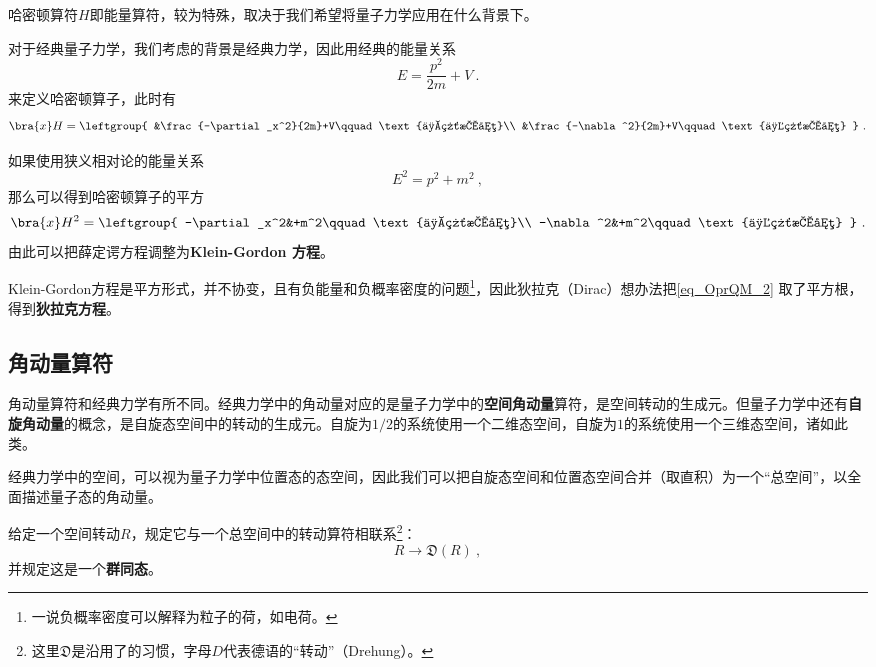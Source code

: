 哈密顿算符$H$即能量算符，较为特殊，取决于我们希望将量子力学应用在什么背景下。

对于经典量子力学，我们考虑的背景是经典力学，因此用经典的能量关系
\begin{equation}
E=\frac{p^2}{2m}+V~.
\end{equation}
来定义哈密顿算子，此时有
\begin{equation}
\bra{x}H = \leftgroup{
    &\frac{-\partial_x^2}{2m}+V\qquad\text{一维情况}\\
    &\frac{-\nabla^2}{2m}+V\qquad\text{三维情况}
}~.
\end{equation}

如果使用狭义相对论的能量关系
\begin{equation}
E^2 = p^2+m^2~,
\end{equation}
那么可以得到哈密顿算子的平方
\begin{equation}\label{eq_OprQM_2}
\bra{x}H^2 = \leftgroup{
    -\partial_x^2&+m^2\qquad\text{一维情况}\\
    -\nabla^2&+m^2\qquad\text{三维情况}
}~.
\end{equation}
由此可以把薛定谔方程调整为\textbf{Klein-Gordon 方程}。

Klein-Gordon方程是平方形式，并不协变，且有负能量和负概率密度的问题\footnote{一说负概率密度可以解释为粒子的荷，如电荷。}，因此狄拉克（Dirac）想办法把\autoref{eq_OprQM_2} 取了平方根，得到\textbf{狄拉克方程}。



\subsection{角动量算符}\label{sub_OprQM_1}

角动量算符和经典力学有所不同。经典力学中的角动量对应的是量子力学中的\textbf{空间角动量}算符，是空间转动的生成元。但量子力学中还有\textbf{自旋角动量}的概念，是自旋态空间中的转动的生成元。自旋为$1/2$的系统使用一个二维态空间，自旋为$1$的系统使用一个三维态空间，诸如此类。

经典力学中的空间，可以视为量子力学中位置态的态空间，因此我们可以把自旋态空间和位置态空间合并（取直积）为一个“总空间”，以全面描述量子态的角动量。

给定一个空间转动$R$，规定它与一个总空间中的转动算符相联系\footnote{这里$\mathfrak{D}$是沿用了\cite{Sakurai}的习惯，字母$D$代表德语的“转动”（Drehung）。}：
\begin{equation}
R\to \mathfrak{D}(R)~,
\end{equation}
并规定这是一个\textbf{群同态}。


